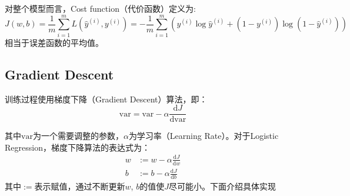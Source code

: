 	对整个模型而言，Cost function（代价函数）定义为:
	\begin{equation}
		J(w, b) = \frac{1}{m} \sum_{i=1}^{m} L(\hat{y}^{(i)}, y^{(i)}) = -\frac{1}{m} \sum_{i=1}^{m} (y^{(i)} \log \hat{y}^{(i)} + (1 - y^{(i)}) \log (1 - \hat{y}^{(i)})) \label{eq:cost}
	\end{equation}
	相当于误差函数的平均值。

	\subsection{Gradient Descent}

	训练过程使用梯度下降（Gradient Descent）算法，即：
	\begin{equation}
		\mathrm{var} = \mathrm{var} - \alpha \frac{\mathrm{d}J}{\mathrm{d}\mathrm{var}} \label{eq:gradient}
	\end{equation}

	其中$\mathrm{var}$为一个需要调整的参数，$\alpha$为学习率（Learning Rate）。对于Logistic Regression，梯度下降算法的表达式为：
	\begin{equation}
		\begin{aligned}
		w &:= w - \alpha \frac{\mathrm{d}J}{\mathrm{d}w} \\
		b &:= b - \alpha \frac{\mathrm{d}J}{\mathrm{d}b}
		\end{aligned} 
		\label{eq:gradient_logistic}
	\end{equation}
	其中$:=$表示赋值，通过不断更新$w$, $b$的值使$J$尽可能小。下面介绍具体实现

